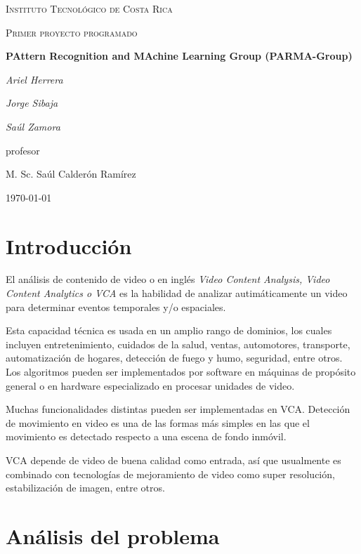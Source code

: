 \documentclass{IEEEtran}
\begin{document}
\begin{titlepage}
  \centering
  {\scshape\LARGE Instituto Tecnol\'ogico de Costa Rica \par}
  \vspace{1cm}
  {\scshape\Large Primer proyecto programado\par}
  \vspace{1.5cm}
  {\huge\bfseries PAttern Recognition and MAchine Learning Group (PARMA-Group)\par}
  \vspace{2cm}
  {\Large\itshape Ariel Herrera\par}
  {\Large\itshape Jorge Sibaja\par}
  {\Large\itshape Sa\'ul Zamora\par}
  \vfill
  profesor\par
  M. Sc. Sa\'ul Calder\'on Ram\'irez \textsc{}

  \vfill

  {\large \today\par}
\end{titlepage}

\section{Introducci\'on}

El an\'alisis de contenido de video o en ingl\'es \emph{Video Content Analysis, Video Content Analytics o VCA} es la habilidad de analizar autim\'aticamente un video para determinar eventos temporales y/o espaciales.

Esta capacidad t\'ecnica es usada en un amplio rango de dominios, los cuales incluyen entretenimiento, cuidados de la salud, ventas, automotores, transporte, automatizaci\'on de hogares, detecci\'on de fuego y humo, seguridad, entre otros. Los algoritmos pueden ser implementados por software en m\'aquinas de prop\'osito general o en hardware especializado en procesar unidades de video.

Muchas funcionalidades distintas pueden ser implementadas en VCA. Detecci\'on de movimiento en video es una de las formas m\'as simples en las que el movimiento es detectado respecto a una escena de fondo inm\'ovil.

VCA depende de video de buena calidad como entrada, as\'i que usualmente es combinado con tecnolog\'ias de mejoramiento de video como super resoluci\'on, estabilizaci\'on de imagen, entre otros.

\section{An\'alisis del problema}
\end{document}
